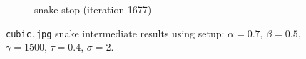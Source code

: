 \documentclass[11pt,a4paper]{article}
\begin{document}
\begin{figure}[H]
\begin{subfigure}[t]{0.24\textwidth}
        \caption{snake stop (iteration 1677)}
        \label{fig:cubic_end}
    \end{subfigure}
    \caption{\texttt{cubic.jpg} snake intermediate results using setup: $\alpha
= 0.7$, $\beta = 0.5$, $\gamma = 1500$, $\tau = 0.4$, $\sigma = 2$.}
    \label{fig:cubic_intermediate}
\end{figure}
\end{document}
